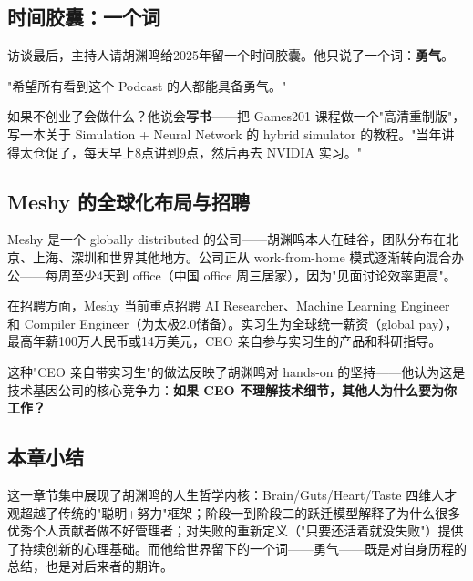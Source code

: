 \subsection{时间胶囊：一个词}

访谈最后，主持人请胡渊鸣给2025年留一个时间胶囊。他只说了一个词：\textbf{勇气}。

"希望所有看到这个 Podcast 的人都能具备勇气。"

如果不创业了会做什么？他说会\textbf{写书}——把 Games201 课程做一个"高清重制版"，写一本关于 Simulation + Neural Network 的 hybrid simulator 的教程。"当年讲得太仓促了，每天早上8点讲到9点，然后再去 NVIDIA 实习。"

\subsection{Meshy 的全球化布局与招聘}

Meshy 是一个 globally distributed 的公司——胡渊鸣本人在硅谷，团队分布在北京、上海、深圳和世界其他地方。公司正从 work-from-home 模式逐渐转向混合办公——每周至少4天到 office（中国 office 周三居家），因为"见面讨论效率更高"。

在招聘方面，Meshy 当前重点招聘 AI Researcher、Machine Learning Engineer 和 Compiler Engineer（为太极2.0储备）。实习生为全球统一薪资（global pay），最高年薪100万人民币或14万美元，CEO 亲自参与实习生的产品和科研指导。

这种"CEO 亲自带实习生"的做法反映了胡渊鸣对 hands-on 的坚持——他认为这是技术基因公司的核心竞争力：\textbf{如果 CEO 不理解技术细节，其他人为什么要为你工作？}

\subsection{本章小结}

这一章节集中展现了胡渊鸣的人生哲学内核：Brain/Guts/Heart/Taste 四维人才观超越了传统的"聪明+努力"框架；阶段一到阶段二的跃迁模型解释了为什么很多优秀个人贡献者做不好管理者；对失败的重新定义（"只要还活着就没失败"）提供了持续创新的心理基础。而他给世界留下的一个词——勇气——既是对自身历程的总结，也是对后来者的期许。

